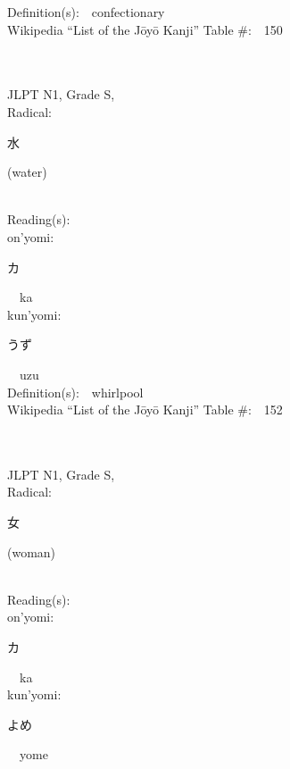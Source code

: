\begin{multicols}{2}
Definition(s):\ \ confectionary \\
Wikipedia ``List of the J\=oy\=o Kanji'' Table \#:\ \ 150 \\
\ \ \\
{\fontsize{34pt}{40pt}  }\ \ \\
{JLPT N1, Grade S, \\Radical:\ \ {\begin{CJK}{UTF8}{min} 水 \end{CJK}} (water) } \\
Reading(s):\ \ \\
{\hspace*{1em}}on'yomi:\ \ \\
{\hspace*{2em}}{\begin{CJK}{UTF8}{min} カ \end{CJK}}\ \ ka\ \ \\
{\hspace*{1em}}kun'yomi:\ \ \\
{\hspace*{2em}}{\begin{CJK}{UTF8}{min} うず \end{CJK}}\ \ uzu\ \ \\
Definition(s):\ \ whirlpool \\
Wikipedia ``List of the J\=oy\=o Kanji'' Table \#:\ \ 152 \\
\ \ \\
{\fontsize{34pt}{40pt}  }\ \ \\
{JLPT N1, Grade S, \\Radical:\ \ {\begin{CJK}{UTF8}{min} 女 \end{CJK}} (woman) } \\
Reading(s):\ \ \\
{\hspace*{1em}}on'yomi:\ \ \\
{\hspace*{2em}}{\begin{CJK}{UTF8}{min} カ \end{CJK}}\ \ ka\ \ \\
{\hspace*{1em}}kun'yomi:\ \ \\
{\hspace*{2em}}{\begin{CJK}{UTF8}{min} よめ \end{CJK}}\ \ yome\ \ \\

\end{multicols}
